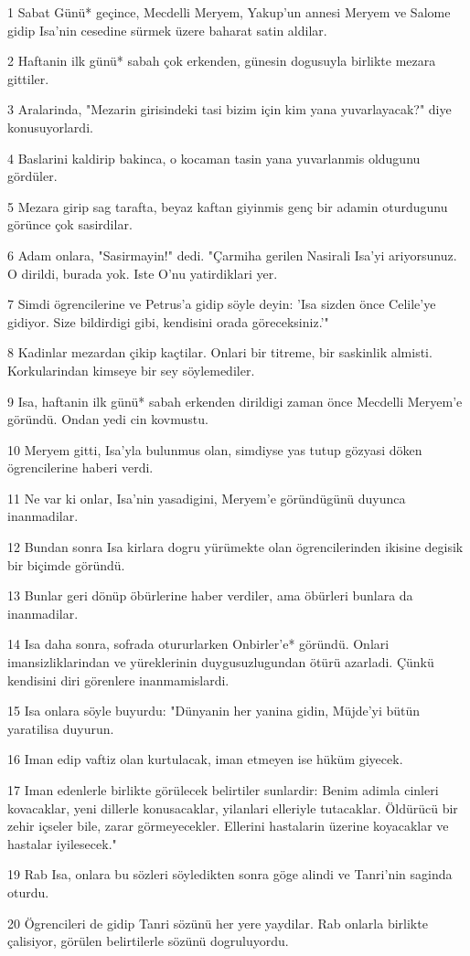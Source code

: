 \par 1 Sabat Günü* geçince, Mecdelli Meryem, Yakup'un annesi Meryem ve Salome gidip Isa'nin cesedine sürmek üzere baharat satin aldilar.
\par 2 Haftanin ilk günü* sabah çok erkenden, günesin dogusuyla birlikte mezara gittiler.
\par 3 Aralarinda, "Mezarin girisindeki tasi bizim için kim yana yuvarlayacak?" diye konusuyorlardi.
\par 4 Baslarini kaldirip bakinca, o kocaman tasin yana yuvarlanmis oldugunu gördüler.
\par 5 Mezara girip sag tarafta, beyaz kaftan giyinmis genç bir adamin oturdugunu görünce çok sasirdilar.
\par 6 Adam onlara, "Sasirmayin!" dedi. "Çarmiha gerilen Nasirali Isa'yi ariyorsunuz. O dirildi, burada yok. Iste O'nu yatirdiklari yer.
\par 7 Simdi ögrencilerine ve Petrus'a gidip söyle deyin: 'Isa sizden önce Celile'ye gidiyor. Size bildirdigi gibi, kendisini orada göreceksiniz.'"
\par 8 Kadinlar mezardan çikip kaçtilar. Onlari bir titreme, bir saskinlik almisti. Korkularindan kimseye bir sey söylemediler.
\par 9 Isa, haftanin ilk günü* sabah erkenden dirildigi zaman önce Mecdelli Meryem'e göründü. Ondan yedi cin kovmustu.
\par 10 Meryem gitti, Isa'yla bulunmus olan, simdiyse yas tutup gözyasi döken ögrencilerine haberi verdi.
\par 11 Ne var ki onlar, Isa'nin yasadigini, Meryem'e göründügünü duyunca inanmadilar.
\par 12 Bundan sonra Isa kirlara dogru yürümekte olan ögrencilerinden ikisine degisik bir biçimde göründü.
\par 13 Bunlar geri dönüp öbürlerine haber verdiler, ama öbürleri bunlara da inanmadilar.
\par 14 Isa daha sonra, sofrada otururlarken Onbirler'e* göründü. Onlari imansizliklarindan ve yüreklerinin duygusuzlugundan ötürü azarladi. Çünkü kendisini diri görenlere inanmamislardi.
\par 15 Isa onlara söyle buyurdu: "Dünyanin her yanina gidin, Müjde'yi bütün yaratilisa duyurun.
\par 16 Iman edip vaftiz olan kurtulacak, iman etmeyen ise hüküm giyecek.
\par 17 Iman edenlerle birlikte görülecek belirtiler sunlardir: Benim adimla cinleri kovacaklar, yeni dillerle konusacaklar, yilanlari elleriyle tutacaklar. Öldürücü bir zehir içseler bile, zarar görmeyecekler. Ellerini hastalarin üzerine koyacaklar ve hastalar iyilesecek."
\par 19 Rab Isa, onlara bu sözleri söyledikten sonra göge alindi ve Tanri'nin saginda oturdu.
\par 20 Ögrencileri de gidip Tanri sözünü her yere yaydilar. Rab onlarla birlikte çalisiyor, görülen belirtilerle sözünü dogruluyordu.


